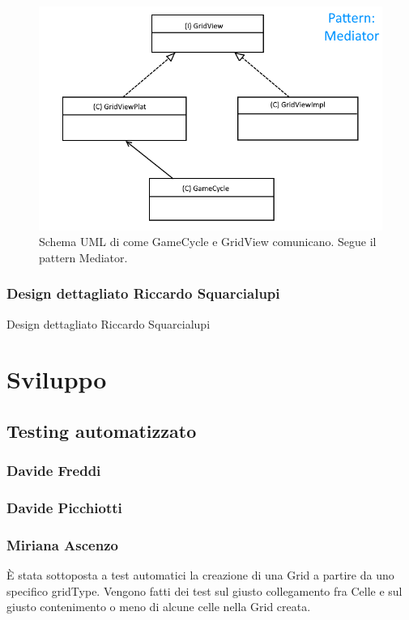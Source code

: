 \documentclass[a4paper,12pt]{report}
\begin{document}
\begin{figure}[!t]
\centering{}
\includegraphics[width=\textwidth]{images/gridImages/gridMediator.png}
\caption{Schema UML di come GameCycle e GridView comunicano. Segue il pattern Mediator.}
\label{img:gridmediator}
\end{figure}

\subsection{Design dettagliato Riccardo Squarcialupi}
Design dettagliato Riccardo Squarcialupi

\chapter{Sviluppo}
\section{Testing automatizzato}

\subsection{Davide Freddi}
\subsection{Davide Picchiotti}
\subsection{Miriana Ascenzo}

È stata sottoposta a test automatici la creazione di una Grid a partire da uno specifico gridType.
%
Vengono fatti dei test sul giusto collegamento fra Celle e sul giusto contenimento o meno di alcune celle nella Grid creata.
\end{document}

